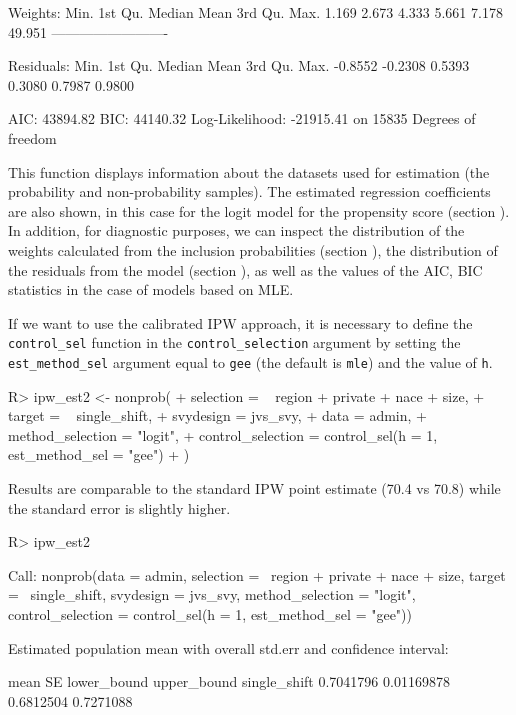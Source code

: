 \documentclass[
]{jss}
\begin{document}
\begin{CodeChunk}
\begin{CodeOutput}
Weights:
   Min. 1st Qu.  Median    Mean 3rd Qu.    Max. 
  1.169   2.673   4.333   5.661   7.178  49.951 
-------------------------

Residuals:
   Min. 1st Qu.  Median    Mean 3rd Qu.    Max. 
-0.8552 -0.2308  0.5393  0.3080  0.7987  0.9800 

AIC: 43894.82
BIC: 44140.32
Log-Likelihood: -21915.41 on 15835 Degrees of freedom
\end{CodeOutput}
\end{CodeChunk}

This function displays information about the datasets used for
estimation (the probability and non-probability samples). The estimated
regression coefficients are also shown, in this case for the logit model
for the propensity score (section ). In
addition, for diagnostic purposes, we can inspect the distribution of
the weights calculated from the inclusion probabilities (section
), the distribution of the residuals from the model
(section ), as well as the values of the AIC, BIC
statistics in the case of models based on MLE.

If we want to use the calibrated IPW approach, it is necessary to define
the \texttt{control\_sel} function in the \texttt{control\_selection}
argument by setting the \texttt{est\_method\_sel} argument equal to
\texttt{gee} (the default is \texttt{mle}) and the value of \texttt{h}.

\begin{CodeChunk}
\begin{CodeInput}
R> ipw_est2 <- nonprob(
+   selection = ~ region + private + nace + size,
+   target = ~ single_shift,
+   svydesign = jvs_svy,
+   data = admin,
+   method_selection = "logit",
+   control_selection = control_sel(h = 1, est_method_sel = "gee")
+ )
\end{CodeInput}
\end{CodeChunk}

Results are comparable to the standard IPW point estimate (70.4 vs 70.8)
while the standard error is slightly higher.

\begin{CodeChunk}
\begin{CodeInput}
R> ipw_est2
\end{CodeInput}
\begin{CodeOutput}

Call:
nonprob(data = admin, selection = ~region + private + nace + 
    size, target = ~single_shift, svydesign = jvs_svy, method_selection = "logit", 
    control_selection = control_sel(h = 1, est_method_sel = "gee"))

Estimated population mean with overall std.err and confidence interval:

                  mean         SE lower_bound upper_bound
single_shift 0.7041796 0.01169878   0.6812504   0.7271088
\end{CodeOutput}
\end{CodeChunk}
\end{document}
